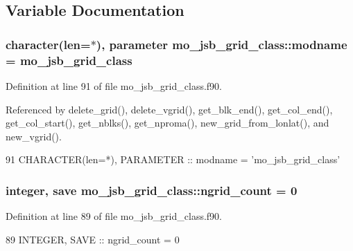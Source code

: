 \subsection{Variable Documentation}
\hypertarget{namespacemo__jsb__grid__class_a2d6c1334c4fbe274a9f0b7acd6fd6361}{}
\subsubsection[{modname}]{\setlength{\rightskip}{0pt plus 5cm}character(len=$\ast$), parameter mo\+\_\+jsb\+\_\+grid\+\_\+class\+::modname = \textquotesingle{}mo\+\_\+jsb\+\_\+grid\+\_\+class\textquotesingle{}}\label{namespacemo__jsb__grid__class_a2d6c1334c4fbe274a9f0b7acd6fd6361}


Definition at line 91 of file mo\+\_\+jsb\+\_\+grid\+\_\+class.\+f90.



Referenced by delete\+\_\+grid(), delete\+\_\+vgrid(), get\+\_\+blk\+\_\+end(), get\+\_\+col\+\_\+end(), get\+\_\+col\+\_\+start(), get\+\_\+nblks(), get\+\_\+nproma(), new\+\_\+grid\+\_\+from\+\_\+lonlat(), and new\+\_\+vgrid().


\begin{DoxyCode}
91   \textcolor{keywordtype}{CHARACTER(len=*)}, \textcolor{keywordtype}{PARAMETER} :: modname = \textcolor{stringliteral}{'mo\_jsb\_grid\_class'}
\end{DoxyCode}
\hypertarget{namespacemo__jsb__grid__class_ad64217c2b3f2f8da3c4b7297bc650ae4}{}
\subsubsection[{ngrid\+\_\+count}]{\setlength{\rightskip}{0pt plus 5cm}integer, save mo\+\_\+jsb\+\_\+grid\+\_\+class\+::ngrid\+\_\+count = 0}\label{namespacemo__jsb__grid__class_ad64217c2b3f2f8da3c4b7297bc650ae4}


Definition at line 89 of file mo\+\_\+jsb\+\_\+grid\+\_\+class.\+f90.


\begin{DoxyCode}
89   \textcolor{keywordtype}{INTEGER}, \textcolor{keywordtype}{SAVE} :: ngrid\_count = 0
\end{DoxyCode}
